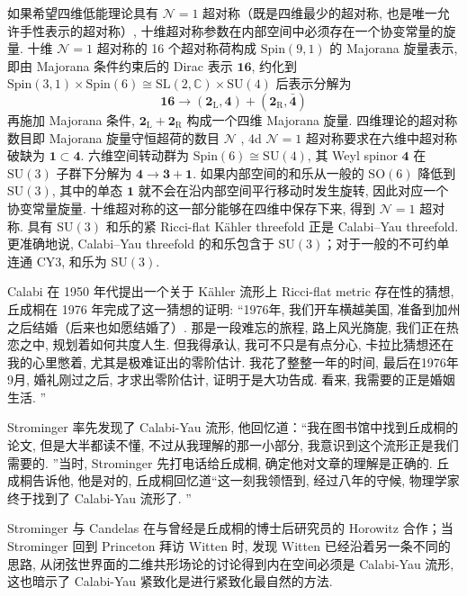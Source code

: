 \documentclass[10pt]{article}
\numberwithin{equation}{section}
\begin{document}
如果希望四维低能理论具有 $\mathcal N=1$ 超对称（既是四维最少的超对称, 也是唯一允许手性表示的超对称）, 十维超对称参数在内部空间中必须存在一个协变常量的旋量. 十维 $\mathcal{N}=1$ 超对称的 16 个超对称荷构成 $\mathrm{Spi n}(9,1)$ 的 Majorana 旋量表示, 即由 Majorana 条件约束后的 Dirac 表示 $\mathbf{16}$, 约化到 $\mathrm{Sp in}(3,1)\times \mathrm{Sp in}(6)\cong \mathrm{SL}(2,\mathbb{C})\times \mathrm{SU}(4)$ 后表示分解为
\begin{equation}
\mathbf{16}\to (\mathbf{2}_{\mathrm{L}},\mathbf{4})+(\mathbf{2}_{\mathrm{R}},\bar{\mathbf{4}})
\end{equation}
再施加 Majorana 条件,  $\mathbf{2}_{\mathrm{L}}+\mathbf{2}_{\mathrm{R}}$ 构成一个四维 Majorana 旋量. 四维理论的超对称数目即 Majorana 旋量守恒超荷的数目 $\mathcal{N}$ , 4d $\mathcal{N}=1$ 超对称要求在六维中超对称破缺为 $\mathbf{1}\subset \mathbf{4}$. 六维空间转动群为 $\mathrm{Spin}(6)\cong \mathrm{SU}(4)$, 其 Weyl spinor $\mathbf 4$ 在 $\mathrm{SU}(3)$ 子群下分解为 $\mathbf 4\rightarrow\mathbf 3+\mathbf1$. 如果内部空间的和乐从一般的 $\mathrm{SO}(6)$ 降低到 $\mathrm{SU}(3)$, 其中的单态 $\mathbf1$ 就不会在沿内部空间平行移动时发生旋转, 因此对应一个协变常量旋量. 十维超对称的这一部分能够在四维中保存下来, 得到 $\mathcal N=1$ 超对称. 具有 $\mathrm{SU}(3)$ 和乐的紧 Ricci-flat Kähler threefold 正是 Calabi–Yau threefold. 更准确地说, Calabi–Yau threefold 的和乐包含于 $\mathrm{SU}(3)$；对于一般的不可约单连通 CY3, 和乐为 $\mathrm{SU}(3)$. 

Calabi 在 1950 年代提出一个关于 Kähler 流形上 Ricci-flat metric 存在性的猜想, 丘成桐在 1976 年完成了这一猜想的证明\cite{Yau1977,Yau1978}:
“1976年, 我们开车横越美国, 准备到加州之后结婚（后来也如愿结婚了）. 那是一段难忘的旅程, 路上风光旖旎, 我们正在热恋之中, 规划着如何共度人生. 但我得承认, 我可不只是有点分心, 卡拉比猜想还在我的心里憋着, 尤其是极难证出的零阶估计. 我花了整整一年的时间, 最后在1976年9月, 婚礼刚过之后, 才求出零阶估计, 证明于是大功告成. 看来, 我需要的正是婚姻生活. ”

Strominger 率先发现了 Calabi-Yau 流形, 他回忆道：“我在图书馆中找到丘成桐的论文, 但是大半都读不懂, 不过从我理解的那一小部分, 我意识到这个流形正是我们需要的. ”当时, Strominger 先打电话给丘成桐, 确定他对文章的理解是正确的. 丘成桐告诉他, 他是对的, 丘成桐回忆道“这一刻我领悟到, 经过八年的守候, 物理学家终于找到了 Calabi-Yau 流形了. ”

Strominger 与 Candelas 在与曾经是丘成桐的博士后研究员的 Horowitz 合作；当 Strominger 回到 Princeton 拜访 Witten 时, 发现 Witten 已经沿着另一条不同的思路, 从闭弦世界面的二维共形场论的讨论得到内在空间必须是 Calabi-Yau 流形, 这也暗示了 Calabi-Yau 紧致化是进行紧致化最自然的方法. 
\end{document}
